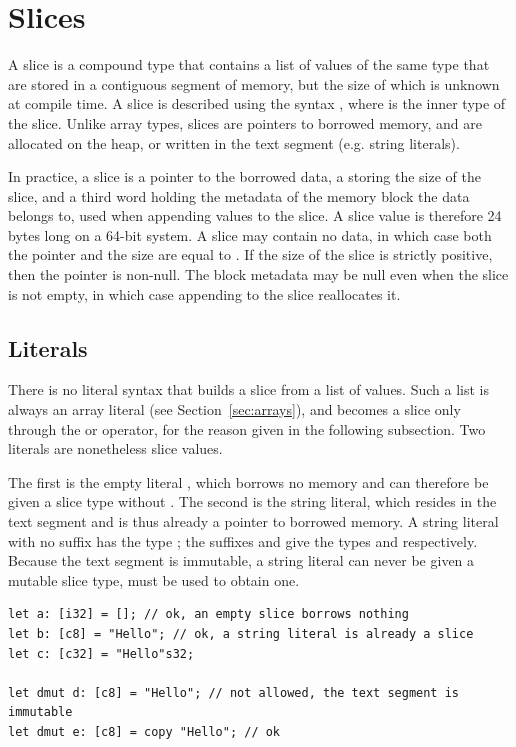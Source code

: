 \section{Slices}%
\label{sec:slices}

A slice is a compound type that contains a list of values of the same type that
are stored in a contiguous segment of memory, but the size of which is unknown
at compile time. A slice is described using the syntax \token{[T]}, where
 is the inner type of the slice. Unlike array types, slices are
pointers to borrowed memory, and are allocated on the heap, or written in the
text segment (e.g. string literals).

In practice, a slice is a pointer  to the borrowed data, a
 storing the size of the slice, and a third word holding the
metadata of the memory block the data belongs to, used when appending values to
the slice. A slice value is therefore 24 bytes long on a 64-bit system. A slice
may contain no data, in which case both the pointer and the size are equal to
. If the size of the slice is strictly positive, then the pointer is
non-null. The block metadata may be null even when the slice is not empty, in
which case appending to the slice reallocates it.




\subsection{Literals}

There is no literal syntax that builds a slice from a list of values. Such a
list is always an array literal (see Section~\ref{sec:arrays}), and becomes a
slice only through the  or  operator, for the reason
given in the following subsection. Two literals are nonetheless slice values.

The first is the empty literal \token{[]}, which borrows no memory and can
therefore be given a slice type without . The second is the string
literal, which resides in the text segment and is thus already a pointer to
borrowed memory. A string literal with no suffix has the type \token{[c8]}; the
suffixes  and  give the types \token{[c8]} and
\token{[c32]} respectively. Because the text segment is immutable, a string
literal can never be given a mutable slice type,  must be used to
obtain one.

\begin{lstlisting}[style=coloredverbatimError]
let a: [i32] = []; // ok, an empty slice borrows nothing
let b: [c8] = "Hello"; // ok, a string literal is already a slice
let c: [c32] = "Hello"s32;

let dmut d: [c8] = "Hello"; // not allowed, the text segment is immutable
let dmut e: [c8] = copy "Hello"; // ok
\end{lstlisting}

